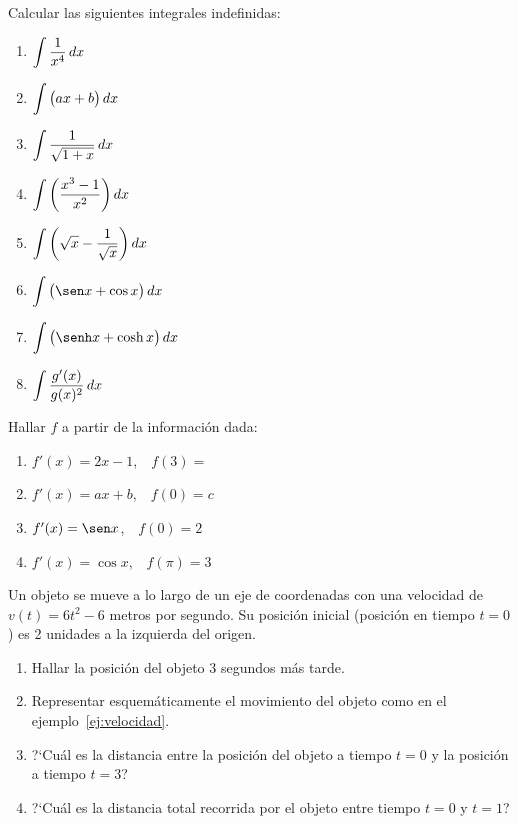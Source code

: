 \item Calcular las siguientes integrales indefinidas:
\begin{multicols}{2}
  \begin{enumerate}
    \item $\displaystyle \int \frac{1}{x^4} \,dx$
    \item $\displaystyle \int \big(ax+b\big) \,dx$
    \item $\displaystyle \int \frac{1}{\sqrt{1+x}} \,dx$
    \item $\displaystyle \int \bigg(\frac{x^3-1}{x^2}\bigg) \,dx$
    \item $\displaystyle \int \bigg(\sqrt{x}-\frac{1}{\sqrt{x}}\bigg) \,dx$
    \item $\D \int \big(\sen x+\cos x\big) \dx$
    \item $\D \int \big(\senh x+\cosh x\big) \dx$
    \item $\displaystyle \int \frac{g'(x)}{g(x)^2} \,dx$
  \end{enumerate}
\end{multicols}

\item Hallar $f$ a partir de la información dada:
\begin{multicols}{2}
  \begin{enumerate}
    \item $f'(x)=2x-1$,\ \ $f(3)= $
    \item $f'(x)=ax+b$,\ \ $f(0)=c $
    \item $f'(x)=\sen x$,\ \ $f(0)= 2$
    \item $f'(x)=\cos x$,\ \ $f(\pi )=3 $
  \end{enumerate}
\end{multicols}

\item Un objeto se mueve a lo largo de un eje de coordenadas con una velocidad de $v(t)=6t^2-6$ metros por segundo. Su posición inicial (posición en tiempo $t=0$) es 2 unidades a la izquierda del origen.
\begin{enumerate}
  \item Hallar la posición del objeto $3$ segundos más tarde.
  \item Representar esquemáticamente el movimiento del objeto como en el ejemplo~\ref{ej:velocidad}.
  \item ?`Cuál es la distancia entre la posición del objeto a tiempo $t=0$ y la posición a tiempo $t=3$?
  \item ?`Cuál es la distancia total recorrida por el objeto entre tiempo $t=0$ y $t=1$?
\end{enumerate}